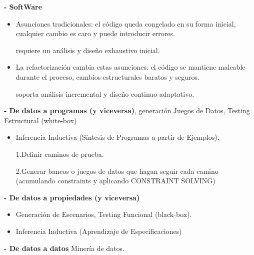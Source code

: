 \documentclass[12pt]{amsart}
\begin{document}
    \textbf{- SoftWare}

    \begin{itemize}
        \item Asunciones tradicionales: el código queda congelado en
        su forma inicial, cualquier cambio es caro y puede introducir
        errores.
        
        \textrightarrow requiere un
        análisis y diseño exhaustivo inicial.

        \item La refactorización cambia estas asunciones: el código
        se mantiene maleable durante el proceso, cambios estructurales
        baratos y seguros.

        \textrightarrow soporta análisis incremental y diseño continuo
        adaptativo.
    \end{itemize}

    \textbf{- De datos a programas (y viceversa)}, generación Juegos de Datos,
    Testing Estructural (white-box)

    \begin{itemize}
        \item \textleftarrow \textrightarrow Inferencia Inductiva
        (Síntesis de Programas a partir de Ejemplos).

        1.Definir caminos de prueba.

        2.Generar bancos o juegos de datos que hagan seguir cada
        camino (acumulando constraints y aplicando CONSTRAINT SOLVING)
    \end{itemize}

    \textbf{- De datos a propiedades (y viceversa)}
    \begin{itemize}
        \item \textleftarrow Generación de Escenarios, Testing Funcional
    (black-box).

        \item \textrightarrow Inferencia Inductiva (Aprendizaje de Especificaciones)
    \end{itemize}
    
    \textbf{- De datos a datos} \textrightarrow Minería de datos.
    
    
\end{document}
